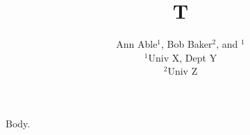 \documentclass{article}
\title{T}
\author{Ann Able$^{1}$, Bob Baker$^{2}$\footremember{zz}{Zebra note.}, and \cat$^{1}$\\
$^{1}$Univ X, Dept Y\\ $^{2}$Univ Z}
\begin{document}
\maketitle
Body.
\end{document}
